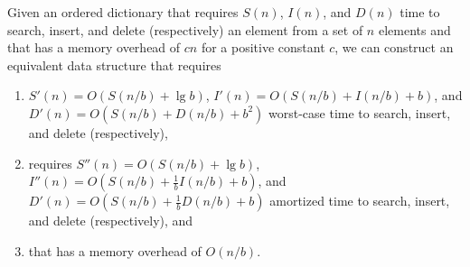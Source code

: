 \documentclass{DIKU-article}
\begin{document}
\begin{theorem}
\label{theorem:elementary-b}
Given an ordered dictionary that requires $S(n)$, $I(n)$, and $D(n)$
time to search, insert, and delete (respectively) an element from a
set of $n$ elements and that has a memory overhead of $cn$ for a
positive constant $c$, we can construct an equivalent data structure
that requires 
\begin{enumerate}
\item $S'(n)=O(S(n/b)+\lg b)$, $I'(n)=O(S(n/b)+I(n/b)+b)$,
and $D'(n)=O(S(n/b)+D(n/b)+b^2)$ worst-case time to search, insert,
and delete (respectively), 
\item requires $S''(n)=O(S(n/b)+\lg b)$,
$I''(n)=O(S(n/b)+\frac{1}{b}I(n/b)+b)$, and
$D'(n)=O(S(n/b)+\frac{1}{b}D(n/b)+b)$ amortized time to search,
insert, and delete (respectively), and 
\item that has a memory overhead of
$O(n/b)$.
\end{enumerate}
\end{theorem}
\end{document}
